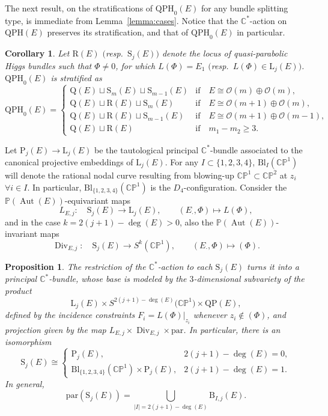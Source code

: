 \documentclass[10pt,a4paper]{amsart}
\newcommand{\field}[1]{\ensuremath{\mathbb{#1}}}
\newcommand{\CC}{\field{C}}
\newcommand{\PP}{\field{P}}
\newcommand{\calO}{\mathcal{O}}
\newcommand{\qp}{\boldsymbol{\cdot}}
\DeclareMathOperator{\Aut}{Aut}
\DeclareMathOperator{\Div}{Div}
\numberwithin{equation}{section}
\newtheorem{Corollary}[Theorem]{Corollary}
\newtheorem{Proposition}[Theorem]{Proposition}
 { \theoremstyle{definition}
\newtheorem{Definition}[Theorem]{Definition}
\newtheorem{Note}[Theorem]{Note}
\newtheorem{Example}[Theorem]{Example}
\newtheorem{Remark}[Theorem]{Remark} }
\begin{document}
The next result, on the stratifications of $\mathrm{QPH}_{0}(E)$ for any bundle splitting type, is immediate from Lemma~\ref{lemma:cases}. Notice that the $\CC^{*}$-action on $\mathrm{QPH}(E)$ preserves its stratification, and that of $\mathrm{QPH}_{0}(E)$ in particular.

\begin{Corollary}\label{cor:strata}
Let $\mathrm{R}(E)$ $($resp.~$\mathrm{S}_{j}(E))$ denote the locus of quasi-parabolic Higgs bundles such that $\Phi\neq 0$, for which $L(\Phi)=E_{1}$ $($resp.~$L(\Phi)\in \mathrm{L}_{j}(E))$. $\mathrm{QPH}_{0}(E)$ is stratified as
\[
\mathrm{QPH}_{0}(E) =
\begin{cases}
\mathrm{Q}(E) \sqcup \mathrm{S}_{m}(E)\sqcup \mathrm{S}_{m-1}(E) & \text{if} \quad E\cong\calO(m)\oplus\calO(m),
\\
\mathrm{Q}(E) \sqcup \mathrm{R}(E) \sqcup \mathrm{S}_{m}(E) & \text{if} \quad E\cong\calO(m+1)\oplus\calO(m),
\\
\mathrm{Q}(E) \sqcup \mathrm{R}(E) \sqcup \mathrm{S}_{m-1}(E) & \text{if} \quad E\cong\calO(m+1)\oplus\calO(m-1),
\\
\mathrm{Q}(E)\sqcup \mathrm{R}(E) & \text{if} \quad m_{1}-m_{2}\geq 3.
\end{cases}
\]
\end{Corollary}

Let $\mathrm{P}_{j}(E)\rightarrow \mathrm{L}_{j}(E)$ be the tautological principal $\CC^{*}$-bundle associated to the canonical projective embeddings of $\mathrm{L}_{j}(E)$. For any $I\subset\{1,2,3,4\}$, $\mathrm{Bl}_{I}(\CC\PP^{1})$ will denote the rational nodal curve resulting from blowing-up $\CC\PP^{1}\subset \CC\PP^{2}$ at $z_{i}$ $\forall i\in I$. In particular, $\mathrm{Bl}_{\{1,2,3,4\}}(\CC\PP^{1})$ is the $D_{4}$-configuration. Consider the $\PP(\Aut(E))$-equivariant maps
\[
L_{E,j}\colon\quad \mathrm{S}_{j}(E)\rightarrow \mathrm{L}_{j}(E),\qquad (E_{\qp},\Phi)\mapsto L(\Phi),
\]
and in the case $k= 2(j+1) -\deg(E) > 0$, also the $\PP(\Aut (E))$-invariant maps
\[
\Div_{E,j}\colon\quad \mathrm{S}_{j}(E)\rightarrow S^{k}(\CC\PP^{1}),\qquad (E_{\qp},\Phi)\mapsto (\Phi).
\]

\begin{Proposition}\label{prop:S_{j}(E)}
The restriction of the $\CC^{*}$-action to each $\mathrm{S}_{j}(E)$ turns it into a principal $\CC^{*}$-bundle, whose base is modeled by the $3$-dimensional subvariety of the product
\[
\mathrm{L}_{j}(E) \times S^{2(j+1) -\deg(E)}\big(\CC\PP^{1}\big)\times \mathrm{QP}(E),
\]
defined by the incidence constraints $F_{i} = L(\Phi)\vert_{z_{i}}$ whenever $z_{i}\not\in(\Phi)$, and projection given by the map $L_{E,j} \times \Div_{E,j} \times \mathrm{par}$.
 In particular, there is an isomorphism
\[
\mathrm{S}_{j}(E) \cong
\begin{cases}
\mathrm{P}_{j}(E), & 2(j+1) -\deg(E) = 0,\\
\mathrm{Bl}_{\{1,2,3,4\}}(\CC\PP^{1})\times \mathrm{P}_{j}(E), & 2(j+1) -\deg(E) = 1.
\end{cases}
\]
In general,
\[
\mathrm{par}(\mathrm{S}_{j}(E)) = \bigcup_{\vert I\vert = 2(j+1) -\deg(E)}\mathrm{B}_{I,j}(E).
\]
\end{Proposition}
\end{document}
